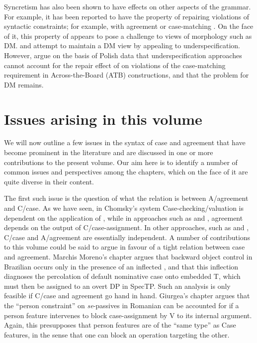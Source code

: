 \documentclass[output=paper]{langsci/langscibook}
\begin{document}
Syncretism has also been shown to have effects on other aspects of the grammar. For example, it has been reported to have the property of repairing violations of syntactic constraints; for example, with agreement \citep{Schütze2003,Bhatt2013} or case-matching \citep{Citko2005,Craenenbroeck2012,Hein2016}. On the face of it, this property of  appears to pose a challenge to  views of morphology such as DM. \citet{Citko2005} and \citet{Asarina2011} attempt to maintain a DM view by appealing to underspecification. However, \citet{Hein2016} argue on the basis of Polish data that underspecification approaches cannot account for the repair effect of  on violations of the case-matching requirement in Across-the-Board (ATB) constructions, and that the problem for DM remains.

\section{Issues arising in this volume}

We will now outline a few issues in the syntax of case and agreement that have become prominent in the literature and are discussed in one or more contributions to the present volume. Our aim here is to identify a number of common issues and perspectives among the chapters, which on the face of it are quite diverse in their content.

The first such issue is the question of what the relation is between A\slash agreement and C\slash case. As we have seen, in Chomsky’s  system Case-checking\slash valuation is dependent on the application of , while in approaches such as \citet{Bobaljik2008Phi} and \citet{Preminger2014}, agreement depends on the output of C\slash case-assignment. In other approaches, such as \citet{Baker2015} and \citet{Manzini2016}, C\slash case and A\slash agreement are essentially independent. A number of contributions to this volume could be said to argue in favour of a tight relation between case and agreement. Marchis Moreno’s chapter argues that backward object control in Brazilian  occurs only in the presence of an inflected , and that this inflection diagnoses the percolation of default nominative case onto embedded T, which must then be assigned to an overt DP in SpecTP. Such an analysis is only feasible if C\slash case and agreement go hand in hand. Giurgea’s chapter argues that the ``person constraint'' on \textit{se}-passives in Romanian can be accounted for if a person feature intervenes to block case-assignment by V to its internal argument. Again, this presupposes that person features are of the ``same type'' as Case features, in the sense that one can block an operation targeting the other.
\end{document}
